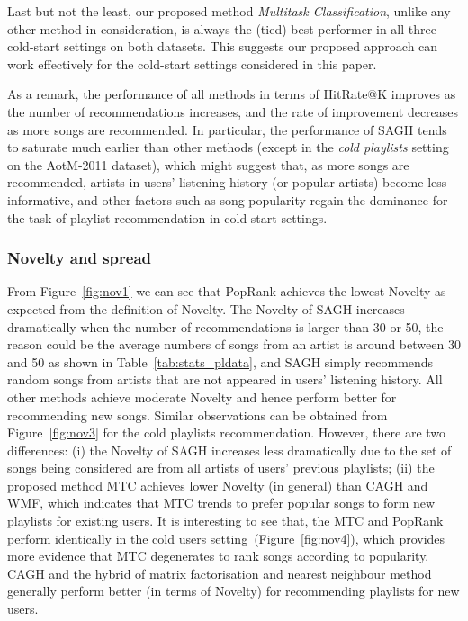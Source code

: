 Last but not the least, our proposed method {\it Multitask Classification}, unlike any other method in consideration,
is always the (tied) best performer in all three cold-start settings on both datasets.
This suggests our proposed approach can work effectively for the cold-start settings considered in this paper.

As a remark, the performance of all methods in terms of HitRate@K improves as the number of recommendations increases,
and the rate of improvement decreases as more songs are recommended.
In particular, the performance of SAGH tends to saturate much earlier than other methods 
(except in the \emph{cold playlists} setting on the AotM-2011 dataset),
which might suggest that, as more songs are recommended, artists in users' listening history (or popular artists) become less informative,
and other factors such as song popularity regain the dominance for the task of playlist recommendation in cold start settings.


\subsubsection{Novelty and spread}



From Figure~\ref{fig:nov1} we can see that PopRank achieves the lowest Novelty as expected from the definition of Novelty.
The Novelty of SAGH increases dramatically when the number of recommendations is larger than 30 or 50, the reason could be the average 
numbers of songs from an artist is around between 30 and 50 as shown in Table~\ref{tab:stats_pldata}, and SAGH simply recommends random
songs from artists that are not appeared in users' listening history.
All other methods achieve moderate Novelty and hence perform better for recommending new songs.
Similar observations can be obtained from Figure~\ref{fig:nov3} for the cold playlists recommendation.
However, there are two differences: (i) the Novelty of SAGH increases less dramatically due to the set of songs being considered are from
all artists of users' previous playlists; (ii) the proposed method MTC achieves lower Novelty (in general) than CAGH and WMF, which indicates
that MTC trends to prefer popular songs to form new playlists for existing users.
It is interesting to see that, the MTC and PopRank perform identically in the cold users setting~(Figure~\ref{fig:nov4}),
which provides more evidence that MTC degenerates to rank songs according to popularity.
CAGH and the hybrid of matrix factorisation and nearest neighbour method generally perform better (in terms of Novelty) for recommending 
playlists for new users.

